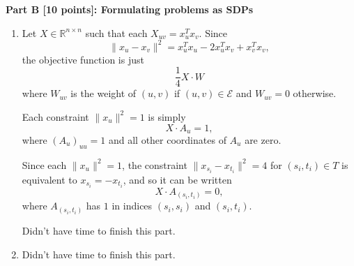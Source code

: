 \documentclass[11pt]{article}
\newcommand{\R}{\mathbb{R}}
\begin{document}
\newpage
\textbf{Part B [10 points]: Formulating problems as SDPs}
\begin{enumerate}
\item Let $X \in \R^{n \times n}$ such that each $X_{uv} = x_u^Tx_v$.
Since \[\|x_u - x_v\|^2 = x_u^Tx_u - 2x_u^Tx_v + x_v^Tx_v,\]
the objective function is just
\[\frac{1}{4} X \cdot W\]
where $W_{uv}$ is the weight of $(u,v)$ if $(u,v) \in \mathcal{E}$ and
$W_{uv} = 0$ otherwise.

Each constraint $\|x_u\|^2 = 1$ is simply
\[X \cdot A_u = 1,\]
where $\left( A_u \right)_{uu} = 1$ and all other coordinates of $A_u$ are
zero.

Since each $\|x_u\|^2 = 1$, the constraint $\|x_{s_i} - x_{t_i}\|^2 = 4$ for
$(s_i,t_i) \in T$ is equivalent to $x_{s_i} = - x_{t_i}$, and so it can be
written
\[X \cdot A_{(s_i,t_i)} = 0,\]
where $A_{(s_i,t_i)}$ has $1$ in indices $(s_i,s_i)$ and $(s_i,t_i)$.

Didn't have time to finish this part.

\item Didn't have time to finish this part.

\end{enumerate}
\end{document}
